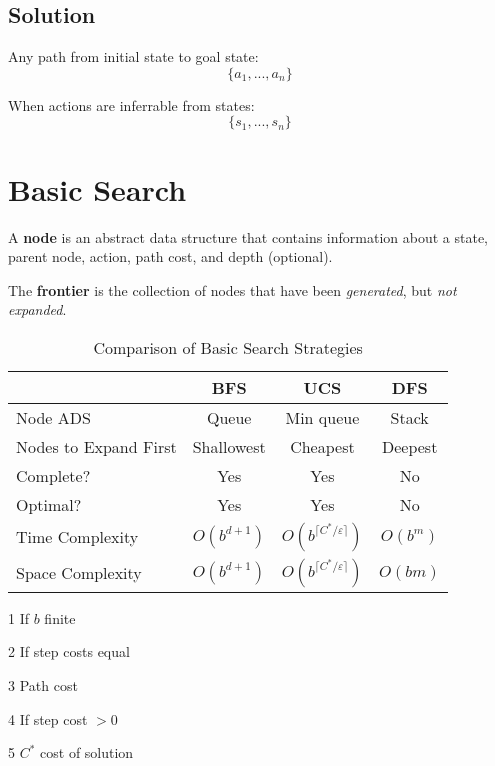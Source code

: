 \documentclass{article}
\begin{document}
    \subsection{Solution}

    Any path from initial state to goal state: $$\{a_1, ..., a_n\}$$
    
    When actions are inferrable from states: $$\{s_1, ..., s_n\}$$

    \section{Basic Search}

    A \textbf{node} is an abstract data structure that contains information about a state, parent node, action, path cost, and depth (optional).

    The \textbf{frontier} is the collection of nodes that have been \textit{generated}, but \textit{not expanded}.

    \begin{table}[h]
        \caption{Comparison of Basic Search Strategies}
        \label{tab:basic-search-comparison}
        \centering
        \begin{threeparttable}
            \begin{tabular}{lccc}
                \toprule
                & BFS & UCS & DFS \\
                \midrule
                Node ADS & Queue & Min queue\tnote{3} & Stack \\
                Nodes to Expand First & Shallowest & Cheapest & Deepest \\
                Complete? & Yes\tnote{1} & Yes\tnote{4} & No \\
                Optimal? & Yes\tnote{2} & Yes & No \\
                Time Complexity & $O(b^{d + 1})$ & $O(b^{\lceil C^*/\varepsilon\rceil})$\tnote{5} & $O(b^m)$ \\
                Space Complexity & $O(b^{d + 1})$ & $O(b^{\lceil C^*/\varepsilon\rceil})$ & $O(bm)$ \\
                \bottomrule
            \end{tabular}
            \begin{tablenotes}
                \item[1] If $b$ finite
                \item[2] If step costs equal
                \item[3] Path cost
                \item[4] If step cost $>0$
                \item[5] $C^*$ cost of solution
            \end{tablenotes}
        \end{threeparttable}
    \end{table}
\end{document}
